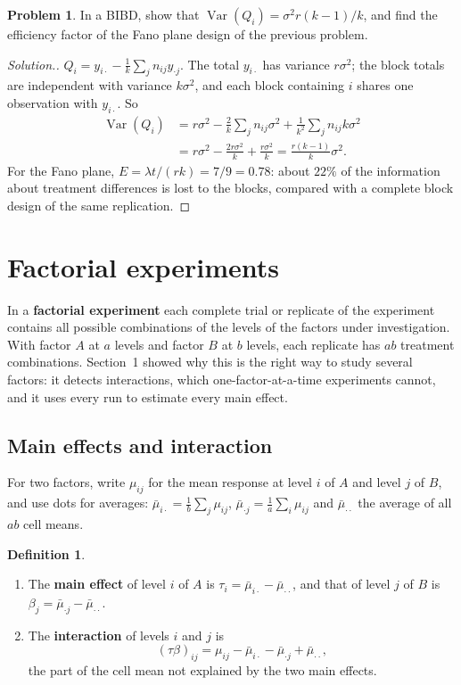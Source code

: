 \documentclass[11pt,a4paper]{article}
\numberwithin{equation}{section}
\DeclareMathOperator{\Var}{Var}
\theoremstyle{definition}
\newtheorem{defn}[thm]{Definition}
\newtheorem{problemx}{Problem}[subsection]
\newenvironment{problem}{\begin{problemx}}{\end{problemx}}
\newenvironment{solution}
  {\renewcommand{\qedsymbol}{}\begin{proof}[\textit{Solution}.]}
  {\end{proof}}
\begin{document}
\begin{problem}
In a BIBD, show that $\Var(Q_i) = \sigma^2r(k - 1)/k$, and find the efficiency factor of the Fano plane design of the previous problem.
\end{problem}

\begin{solution}
$Q_i = y_{i\cdot} - \frac1k\sum_jn_{ij}y_{\cdot j}$. The total $y_{i\cdot}$ has variance $r\sigma^2$; the block totals are independent with variance $k\sigma^2$, and each block containing $i$ shares one
observation with $y_{i\cdot}$. So
\begin{align*}
\Var(Q_i) &= r\sigma^2 - \frac2k\sum_jn_{ij}\sigma^2 + \frac{1}{k^2}\sum_jn_{ij}k\sigma^2 \\
&= r\sigma^2 - \frac{2r\sigma^2}{k} + \frac{r\sigma^2}{k} = \frac{r(k - 1)}{k}\sigma^2 .
\end{align*}
For the Fano plane, $E = \lambda t/(rk) = 7/9 = 0.78$: about $22\%$ of the information about treatment differences is lost to the blocks, compared with a
complete block design of the same replication.
\end{solution}

\section{Factorial experiments}
In a \textbf{factorial experiment} each complete trial or replicate of the experiment contains all possible combinations of the levels of the
factors under investigation. With factor $A$ at $a$ levels and factor $B$ at $b$ levels, each replicate has $ab$ treatment combinations. Section~1
showed why this is the right way to study several factors: it detects interactions, which one-factor-at-a-time experiments cannot, and it uses
every run to estimate every main effect.

\subsection{Main effects and interaction}
For two factors, write $\mu_{ij}$ for the mean response at level $i$ of $A$ and level $j$ of $B$, and use dots for averages: $\bar\mu_{i\cdot} = \frac1b\sum_j\mu_{ij}$, $\bar\mu_{\cdot j} = \frac1a\sum_i\mu_{ij}$
and $\bar\mu_{\cdot\cdot}$ the average of all $ab$ cell means.

\begin{defn}
\begin{enumerate}[label=(\roman*)]
\item The \textbf{main effect} of level $i$ of $A$ is $\tau_i = \bar\mu_{i\cdot} - \bar\mu_{\cdot\cdot}$, and that of level $j$ of $B$ is $\beta_j = \bar\mu_{\cdot j} - \bar\mu_{\cdot\cdot}$.
\item The \textbf{interaction} of levels $i$ and $j$ is
\[
(\tau\beta)_{ij} = \mu_{ij} - \bar\mu_{i\cdot} - \bar\mu_{\cdot j} + \bar\mu_{\cdot\cdot} ,
\]
the part of the cell mean not explained by the two main effects.
\end{enumerate}
\end{defn}
\end{document}
